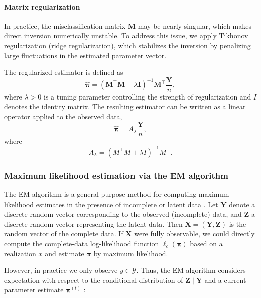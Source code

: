 \documentclass[11pt,a4paper]{article}
\begin{document}
\paragraph{Matrix regularization}

In practice, the misclassification matrix $\boldsymbol{M}$ may be nearly singular, which makes direct inversion numerically unstable. To address this issue, we apply Tikhonov regularization (ridge regularization), which stabilizes the inversion by penalizing large fluctuations in the estimated parameter vector.

The regularized estimator is defined as
\begin{equation*}
	\hat{\boldsymbol{\pi}} =
	\left(\boldsymbol{M}^\top \boldsymbol{M} + \lambda \boldsymbol{I}\right)^{-1} \boldsymbol{M}^\top \frac{\mathbf{Y}}{n},
\end{equation*}
where $\lambda > 0$ is a tuning parameter controlling the strength of regularization and $I$ denotes the identity matrix.
The resulting estimator can be written as a linear operator applied to the observed data, 
\[
\hat{\boldsymbol{\pi}} = A_\lambda \frac{\mathbf{Y}}{n},
\]
where
\begin{equation*}
A_\lambda = \left(M^\top M + \lambda I\right)^{-1} M^\top.
\end{equation*}

\subsubsection{Maximum likelihood estimation via the EM algorithm} \label{sec:ML}

The EM algorithm is a general-purpose method for computing maximum likelihood estimates in the presence of incomplete or latent data \parencite{mclachlan2008}. Let $\boldsymbol{Y}$ denote a discrete random vector corresponding to the observed (incomplete) data, and $\boldsymbol{Z} $ a discrete random vector representing the latent data. Then $\boldsymbol{X}=(\boldsymbol{Y},\boldsymbol{Z})$ is the random vector of the complete data. If $\mathbf{X}$ were fully observable, we could directly compute the complete-data log-likelihood function $\ell_c(\boldsymbol{\pi})$ based on a realization $x$ and estimate $\boldsymbol{\pi}$ by maximum likelihood.

However, in practice we only observe $y \in \mathcal{Y}$. Thus, the EM algorithm considers expectation with respect to the conditional distribution of $\boldsymbol{Z} \mid \boldsymbol{Y}$ and a current parameter estimate $\boldsymbol{\pi}^{(t)}$ \cite{mclachlan2008}:
\end{document}
